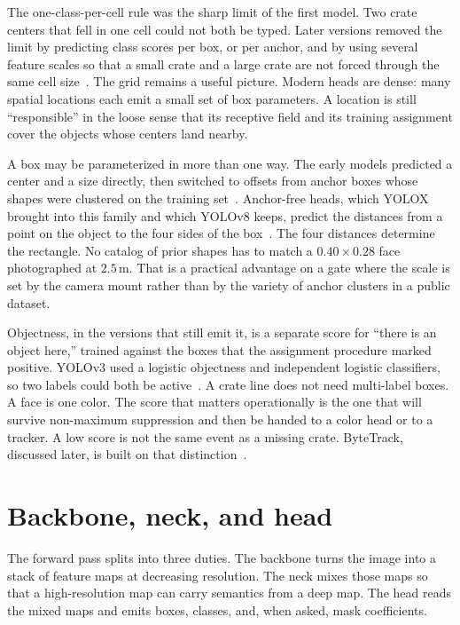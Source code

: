 \documentclass[11pt,a4paper]{article}
\begin{document}
The one-class-per-cell rule was the sharp limit of the first model. Two crate centers that fell in one cell could not both be typed. Later versions removed the limit by predicting class scores per box, or per anchor, and by using several feature scales so that a small crate and a large crate are not forced through the same cell size~\cite{redmon2018yolov3}. The grid remains a useful picture. Modern heads are dense: many spatial locations each emit a small set of box parameters. A location is still ``responsible'' in the loose sense that its receptive field and its training assignment cover the objects whose centers land nearby.

A box may be parameterized in more than one way. The early models predicted a center and a size directly, then switched to offsets from anchor boxes whose shapes were clustered on the training set~\cite{redmon2017yolo9000}. Anchor-free heads, which YOLOX brought into this family and which YOLOv8 keeps, predict the distances from a point on the object to the four sides of the box~\cite{ge2021yolox}. The four distances determine the rectangle. No catalog of prior shapes has to match a $0.40\times 0.28$ face photographed at $2.5\,\mathrm{m}$. That is a practical advantage on a gate where the scale is set by the camera mount rather than by the variety of anchor clusters in a public dataset.

Objectness, in the versions that still emit it, is a separate score for ``there is an object here,'' trained against the boxes that the assignment procedure marked positive. YOLOv3 used a logistic objectness and independent logistic classifiers, so two labels could both be active~\cite{redmon2018yolov3}. A crate line does not need multi-label boxes. A face is one color. The score that matters operationally is the one that will survive non-maximum suppression and then be handed to a color head or to a tracker. A low score is not the same event as a missing crate. ByteTrack, discussed later, is built on that distinction~\cite{zhang2022bytetrack}.

\section{Backbone, neck, and head}
\label{sec:net}

The forward pass splits into three duties. The backbone turns the image into a stack of feature maps at decreasing resolution. The neck mixes those maps so that a high-resolution map can carry semantics from a deep map. The head reads the mixed maps and emits boxes, classes, and, when asked, mask coefficients.
\end{document}
